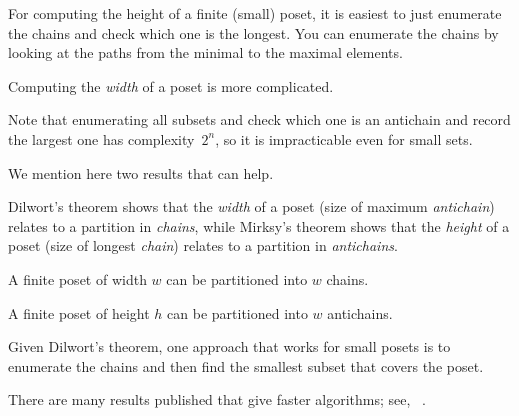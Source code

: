 

\begin{hint}
	For computing the height of a finite (small) poset, it is easiest to just enumerate the chains and check which one is the longest.
	You can enumerate the chains by looking at the paths from the minimal to the maximal elements.
\end{hint}

\begin{hint}
	Computing the \emph{width} of a poset is more complicated.

	Note that enumerating all subsets and check which one is an antichain and record the largest one has complexity~$2^n$, so it is impracticable even for small sets.

	We mention here two results that can help.

	Dilwort's theorem shows that the \emph{width} of a poset (size of maximum \emph{antichain}) relates to a partition in \emph{chains}, while Mirksy's theorem shows that the \emph{height} of a poset (size of longest \emph{chain}) relates to a partition in \emph{antichains}.

	\begin{theorem}
		\label{thm:dilwort}
		A finite poset of width $w$ can be partitioned into $w$ chains.
	\end{theorem}

	\begin{theorem}
		\label{thm:mirsky}
		A finite poset of height $h$ can be partitioned into $w$ antichains.
	\end{theorem}

	Given Dilwort's theorem, one approach that works for small posets is to enumerate the chains and then find the smallest subset that covers the poset.

	There are many results published that give faster algorithms; see, \eg~\cite{chen12decomposition}.

\end{hint}

